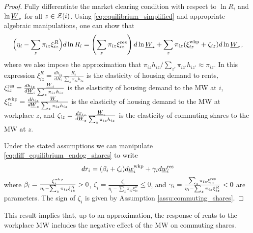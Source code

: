 \begin{proof}    
    Fully differentiate the market clearing condition with respect to $\ln R_i$ 
    and $\ln \underline{W}_z$ for all $z\in\mathcal{Z}(i)$.
    Using \eqref{eq:equilibrium_simplified} and appropriate algebraic 
    manipulations, one can show that
    \begin{equation}\label{eq:diff_equilibrium_endog_shares}
        \Big(\eta_i - \sum_z \pi_{iz} \xi^R_{iz} \Big) d \ln R_i
        = 
        \left(\sum_z \pi_{iz} \xi^{\text{res}}_{iz} \right)d \ln \underline{W}_i 
        + \sum_z \pi_{iz} (\xi^{\text{wkp}}_{iz} + \zeta_{iz}) d \ln \underline{W}_z  ,
    \end{equation}
    where we also impose the approximation that 
    $\pi_{iz} h_{iz} / \sum_{z'}\pi_{iz'} h_{iz'}\approx\pi_{iz}$.
    In this expression
    $\xi^R_{iz} = \frac{d h_{iz}}{d R_i} \frac{R_i}{\sum_z \pi_{iz} h_{iz}}$
    is the elasticity of housing demand to rents,
    $\xi^{\text{res}}_{iz} = \frac{d h_{iz}}{d \underline{W}_i} \frac{\underline{W}_i}{\sum_z \pi_{iz} h_{iz}}$
    is the elasticity of housing demand to the MW at $i$, 
    $\xi^{\text{wkp}}_{iz} = \frac{d h_{iz}}{d \underline{W}_z} \frac{\underline{W}_z}{\sum_z \pi_{iz} h_{iz}}$
    is the elasticity of housing demand to the MW at workplace $z$, and
    $\zeta_{iz} = \frac{d \pi_{iz}}{d \underline{W}_z} \frac{\underline{W}_z}{\sum_z \pi_{iz} h_{iz}}$
    is the elasticity of commuting shares to the MW at $z$.
    
    Under the stated assumptions we can manipulate 
    \eqref{eq:diff_equilibrium_endog_shares} to write
    \begin{equation} \label{eq:theory_representation_endog_shares}
        d r_i = (\beta_i + \zeta_i)  d \underline{w}^{\text{wkp}}_i
              + \gamma_i d \underline{w}^{\text{res}}_i
    \end{equation}
    where
    $\beta_i = \frac{\xi^{\text{wkp}}_i}
                    {\eta_{i} - \sum_z \pi_{iz} \xi_{iz}^R}
              > 0$,
    $\zeta_i = \frac{\zeta_i}
                    {\eta_{i} - \sum_z \pi_{iz} \xi_{iz}^R} \leq 0$, and
    $\gamma_i = \frac{\sum_z \pi_{iz} \xi^{\text{res}}_{iz}}
                     {\eta_{i} - \sum_z \pi_{iz} \xi_{iz}^R} 
              < 0$
    are parameters.
    The sign of $\zeta_i$ is given by Assumption \ref{assu:commuting_shares}.
\end{proof}

This result implies that, up to an approximation, the response of rents to 
the workplace MW includes the negative effect of the MW on commuting shares.


\clearpage
